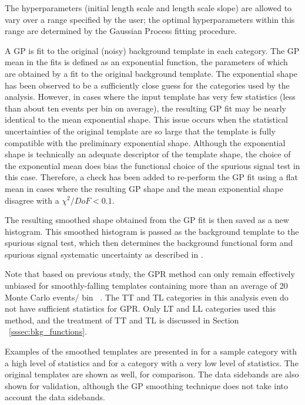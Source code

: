 The hyperparameters (initial length scale and length scale slope) are allowed to vary over a range specified by the user; the optimal hyperparameters within this range are determined by the Gaussian Process fitting procedure.

A GP is fit to the original (noisy) background template in each category. The GP mean in the fits is defined as an exponential function,
the parameters of which are obtained by a fit to the original background template. The exponential
shape has been observed to be a sufficiently close guess for the categories used by the analysis.
However, in cases where the input template has very few statistics (less than about ten events per
bin on average), the resulting GP fit may be nearly identical to the mean exponential shape. This
issue occurs when the statistical uncertainties of the original template are so large that the template
is fully compatible with the preliminary exponential shape. Although the exponential shape
is technically an adequate descriptor of the template shape, the choice of the exponential mean
does bias the functional choice of the spurious signal test in this case. Therefore, a check has been
added to re-perform the GP fit using a flat mean in cases where the resulting GP shape and the
mean exponential shape disagree with a $\chi^2/DoF < 0.1$.

The resulting smoothed shape obtained from the GP fit is then saved as a new histogram. This
smoothed histogram is passed as the background template to the spurious signal test, which then
determines the background functional form and spurious signal systematic uncertainty as described
in \Sect{\ref{ssec:spurious_signal}}.

Note that based on previous study, the GPR method can only remain effectively unbiased for smoothly-falling templates containing more than an average of 20 Monte Carlo events/ bin ~\cite{ATLAS-CONF-2020-026}. 
The TT and TL categories in this analysis even do not have sufficient statistics for GPR. Only LT and LL categories used this method, and the treatment of TT and TL is discussed in Section ~\ref{sssec:bkg_functions}. 

Examples of the smoothed templates are presented in \Fig{\ref{fig:exampleGPR}} for a sample category with a high
level of statistics and for a category with a very low level of statistics.
The original templates are shown as well, for comparison. The data sidebands are also shown for
validation, although the GP smoothing technique does not take into account the data sidebands.

